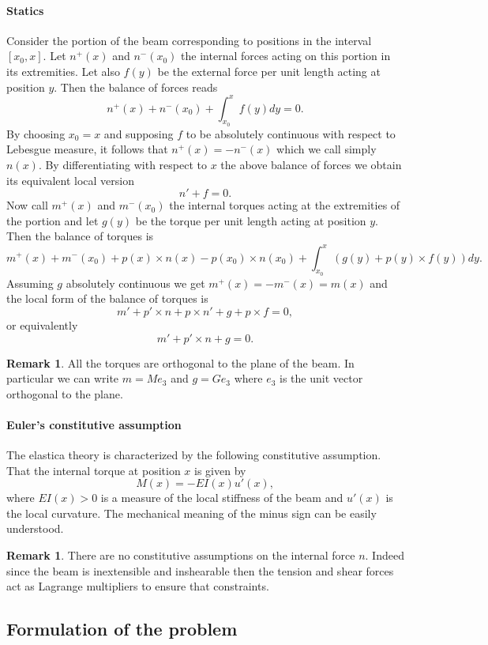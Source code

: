 \documentclass[a4paper,11pt]{article}
\theoremstyle{definition}
\newtheorem{rmk}[prop]{Remark}
\begin{document}
\paragraph{Statics} Consider the portion of the beam corresponding to positions in the interval $[x_0,x]$. Let $n^+(x)$ and $n^-(x_0)$ the internal forces acting on this portion in its extremities. Let also $f(y)$ be the external force per unit length acting at position $y$. Then the balance of forces reads
\[
n^+(x)+n^-(x_0)+\int_{x_0}^xf(y)dy=0.
\]
By choosing $x_0=x$ and supposing $f$ to be absolutely continuous with respect to Lebesgue measure, it follows that $n^+(x)=-n^-(x)$ which we call simply $n(x)$. By differentiating with respect to $x$ the above balance of forces we obtain its equivalent local version
\[
n'+f=0.
\]
Now call $m^+(x)$ and $m^-(x_0)$ the internal torques acting at the extremities of the portion and let $g(y)$ be the torque per unit length acting at position $y$. Then the balance of torques is
\[
m^+(x)+m^-(x_0)+p(x)\times n(x)-p(x_0)\times n(x_0)+\int_{x_0}^x\left(g(y)+p(y)\times f(y)\right)dy.
\]
Assuming $g$ absolutely continuous we get $m^+(x)=-m^-(x)=m(x)$ and the local form of the balance of torques is
\[
m'+p'\times n+p\times n'+g+p\times f=0,
\]
or equivalently
\[
m'+p'\times n+g=0.
\]
\begin{rmk}
All the torques are orthogonal to the plane of the beam. In particular we can write $m=Me_3$ and $g=Ge_3$ where $e_3$ is the unit vector orthogonal to the plane. 
\end{rmk}

\paragraph{Euler's constitutive assumption} The elastica theory is characterized by the following constitutive assumption. That the internal torque at position $x$ is given by
\[
M(x)=-EI(x)u'(x),
\]
where $EI(x)>0$ is a measure of the local stiffness of the beam and $u'(x)$ is the local curvature. The mechanical meaning of the minus sign can be easily understood.
\begin{rmk}
There are no constitutive assumptions on the internal force $n$. Indeed since the beam is inextensible and inshearable then the tension and shear forces act as Lagrange multipliers to ensure that constraints.
\end{rmk}

\subsection{Formulation of the problem}
\end{document}
